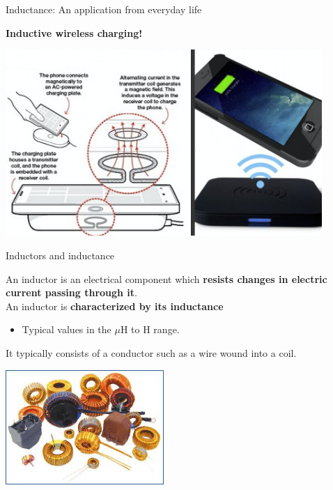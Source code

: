 %
%
%

\begin{frame}{Inductance: An application from everyday life}

{\bf Inductive wireless charging!}

\vspace{0.1cm}

\begin{center}
  \includegraphics[width=0.90\textwidth]{./images/photos/inductive_charging_phone.png}\\
\end{center}

\end{frame}

%
%
%

\begin{frame}{Inductors and inductance}

An inductor is an electrical component which {\bf resists changes in electric current passing through it}.\\
\vspace{0.3cm}
An inductor is {\bf characterized by its inductance}
\begin{itemize}
   \item Typical values in the $\mu$H to H range.
\end{itemize}
\vspace{0.3cm}
It typically consists of a conductor such as a wire wound into a coil.\\
\vspace{0.3cm}
\begin{center}
  \includegraphics[width=0.45\textwidth]{./images/photos/inductors.jpg}\\
\end{center}

\end{frame}

